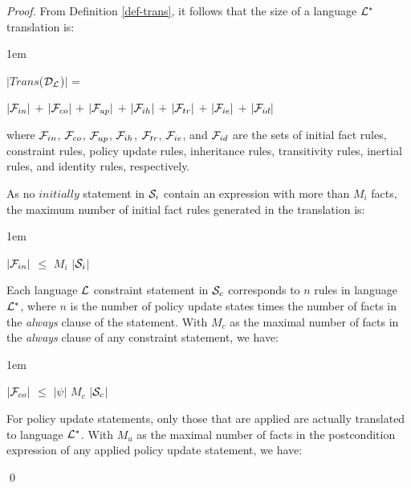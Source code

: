 \documentclass[global,twocolumn,final]{svjour}
\newenvironment{vproof}
  {\begin{proof}\hspace{0.25em}}
  {\qed\end{proof}}
\newenvironment{vquote}
  {\begin{list}{}{\leftmargin 1em}\item[]}
  {\end{list}}
\begin{document}
        \begin{vproof}
          From Definition \ref{def-trans}, it follows that the size of a
          language ${\cal L}^{*}$ translation is:

          \begin{vquote}
            $|$$Trans$(${\cal D_{L}}$)$|$ =

            \hspace{1em}
            $|{\cal F}_{in}|$ $+$
            $|{\cal F}_{co}|$ $+$
            $|{\cal F}_{up}|$ $+$
            $|{\cal F}_{ih}|$ $+$
            $|{\cal F}_{tr}|$ $+$
            $|{\cal F}_{ie}|$ $+$
            $|{\cal F}_{id}|$
          \end{vquote}

          where ${\cal F}_{in}$, ${\cal F}_{co}$, ${\cal F}_{up}$,
          ${\cal F}_{ih}$, ${\cal F}_{tr}$, ${\cal F}_{ie}$, and
          ${\cal F}_{id}$ are the sets of initial fact rules, constraint rules,
          policy update rules, inheritance rules, transitivity rules,
          inertial rules, and identity rules, respectively.

          As no $initially$ statement in ${\cal S}_{i}$ contain an expression
          with more than $M_{i}$ facts, the maximum number of initial fact
          rules generated in the translation is:

          \begin{vquote}
            $|{\cal F}_{in}|$ $\leq$ $M_{i}$ $|$${\cal S}_{i}$$|$
          \end{vquote}

          Each language ${\cal L}$ constraint statement in ${\cal S}_{c}$
          corresponds to $n$ rules in language ${\cal L}^{*}$, where $n$ is
          the number of policy update states times the number of facts in the
          {\em always} clause of the statement. With $M_{c}$ as the maximal
          number of facts in the {\em always} clause of any constraint
          statement, we have:

          \begin{vquote}
            $|{\cal F}_{co}|$ $\leq$ $|\psi|$ $M_{c}$ $|$${\cal S}_{c}$$|$ 
          \end{vquote}

          For policy update statements, only those that are applied are
          actually translated to language ${\cal L}^{*}$. With $M_{u}$ as the
          maximal number of facts in the postcondition expression of any
          applied policy update statement, we have:


\end{vproof}
\end{document}
